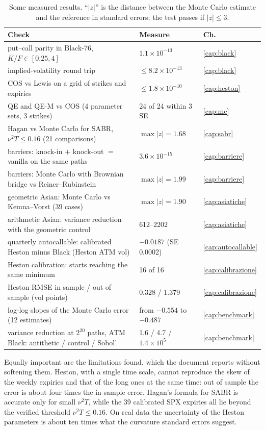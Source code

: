 \begin{table}[ht]
\centering
\small
\caption{Some measured results. ``$|z|$'' is the distance between the Monte Carlo estimate and the reference in
standard errors; the test passes if $|z|\le3$.}
\label{tab:risultati-intro}
\begin{tabularx}{\textwidth}{X l l}
\toprule
Check & Measure & Ch.\\
\midrule
put--call parity in Black-76, $K/F\in[0.25,4]$ & $1.1\times10^{-13}$ & \ref{cap:black}\\
implied-volatility round trip & $\le8.2\times10^{-13}$ & \ref{cap:black}\\
COS vs Lewis on a grid of strikes and expiries & $\le1.8\times10^{-10}$ & \ref{cap:heston}\\
QE and QE-M vs COS (4 parameter sets, 3 strikes) & 24 of 24 within 3 SE & \ref{cap:mc}\\
Hagan vs Monte Carlo for SABR, $\nu^2T\le0.16$ (21 comparisons) & $\max|z|=1.68$ & \ref{cap:sabr}\\
barriers: knock-in $+$ knock-out $=$ vanilla on the same paths & $3.6\times10^{-15}$ & \ref{cap:barriere}\\
barriers: Monte Carlo with Brownian bridge vs Reiner--Rubinstein & $\max|z|=1.99$ & \ref{cap:barriere}\\
geometric Asian: Monte Carlo vs Kemna--Vorst (39 cases) & $\max|z|=1.90$ & \ref{cap:asiatiche}\\
arithmetic Asian: variance reduction with the geometric control & 612--2202 & \ref{cap:asiatiche}\\
quarterly autocallable: calibrated Heston minus Black (Heston ATM vol) & $-0.0187$ (SE 0.0002)
& \ref{cap:autocallable}\\
Heston calibration: starts reaching the same minimum & 16 of 16 & \ref{cap:calibrazione}\\
Heston RMSE in sample / out of sample (vol points) & 0.328 / 1.379 & \ref{cap:calibrazione}\\
log-log slopes of the Monte Carlo error (12 estimates) & from $-0.554$ to $-0.487$ & \ref{cap:benchmark}\\
variance reduction at $2^{20}$ paths, ATM Black: antithetic / control / Sobol'
& 1.6 / 4.7 / $1.4\times10^5$ & \ref{cap:benchmark}\\
\bottomrule
\end{tabularx}
\end{table}

Equally important are the limitations found, which the document reports without softening them. Heston, with a
single time scale, cannot reproduce the skew of the weekly expiries and that of the long ones at the same time: out
of sample the error is about four times the in-sample error. Hagan's formula for SABR is accurate only for small
$\nu^2T$, while the 39 calibrated SPX expiries all lie beyond the verified threshold $\nu^2T\le0.16$. On real data
the uncertainty of the Heston parameters is about ten times what the curvature standard errors suggest.

